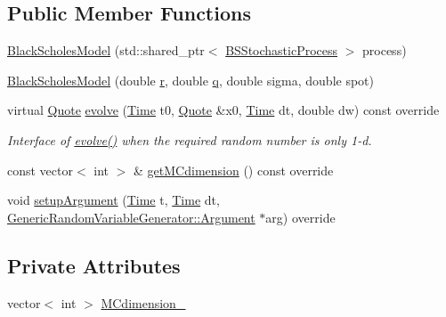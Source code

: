 \subsection*{Public Member Functions}
\begin{DoxyCompactItemize}
\item 
\hyperlink{class_black_scholes_model_a5cc9ce0cdb0f040da65677b2c07f09b5}{Black\+Scholes\+Model} (std\+::shared\+\_\+ptr$<$ \hyperlink{class_b_s_stochastic_process}{B\+S\+Stochastic\+Process} $>$ process)
\item 
\hyperlink{class_black_scholes_model_a59aa736bd849bc59fed035f702e9813b}{Black\+Scholes\+Model} (double \hyperlink{_uniform_l_ecuyer_r_n_g1_8cpp_a372556d73d7e403d9b677b89b21ee572}{r}, double \hyperlink{_uniform_l_ecuyer_r_n_g1_8cpp_a5cf10165494588b84d4231e0e8a5b1a9}{q}, double sigma, double spot)
\item 
virtual \hyperlink{_name_def_8h_a642a6c5fd87319d922637de0e0bb0305}{Quote} \hyperlink{class_black_scholes_model_a67c3ed604a6d057112ec7e7a1a3fb301}{evolve} (\hyperlink{_name_def_8h_ac2d3e0ba793497bcca555c7c2cf64ff3}{Time} t0, \hyperlink{_name_def_8h_a642a6c5fd87319d922637de0e0bb0305}{Quote} \&x0, \hyperlink{_name_def_8h_ac2d3e0ba793497bcca555c7c2cf64ff3}{Time} dt, double dw) const override
\begin{DoxyCompactList}\small\item\em Interface of \hyperlink{class_black_scholes_model_a67c3ed604a6d057112ec7e7a1a3fb301}{evolve()} when the required random number is only 1-\/d. \end{DoxyCompactList}\item 
const vector$<$ int $>$ \& \hyperlink{class_black_scholes_model_a5665e6ea247e4f243082f5c98bbdbad6}{get\+M\+Cdimension} () const override
\item 
void \hyperlink{class_black_scholes_model_a04a6ba4c59cd70a92dedbeb482e9d5aa}{setup\+Argument} (\hyperlink{_name_def_8h_ac2d3e0ba793497bcca555c7c2cf64ff3}{Time} t, \hyperlink{_name_def_8h_ac2d3e0ba793497bcca555c7c2cf64ff3}{Time} dt, \hyperlink{class_generic_random_variable_generator_1_1_argument}{Generic\+Random\+Variable\+Generator\+::\+Argument} $\ast$arg) override
\end{DoxyCompactItemize}
\subsection*{Private Attributes}
\begin{DoxyCompactItemize}
\item 
vector$<$ int $>$ \hyperlink{class_black_scholes_model_a9457c1edc58d9f737f7eeeaaa6812488}{M\+Cdimension\+\_\+}
\end{DoxyCompactItemize}
